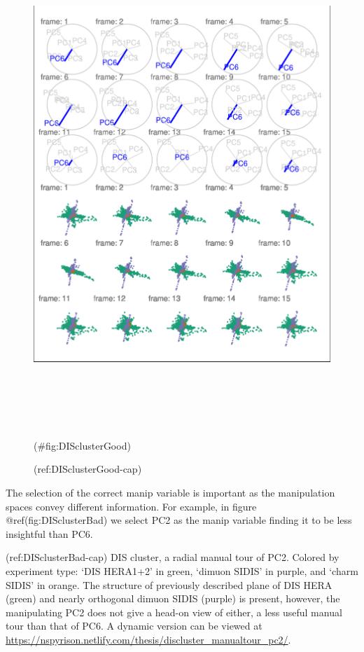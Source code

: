 \begin{Schunk}
\begin{figure}

{\centering \includegraphics[width=6in,height=7.2in]{spinifex_paper_files/figure-latex/DISclusterGood-1} 

}

\caption[(ref:DISclusterGood-cap)]{(ref:DISclusterGood-cap)}(\#fig:DISclusterGood)
\end{figure}
\end{Schunk}

The selection of the correct manip variable is important as the manipulation spaces convey different information. For example, in figure @ref(fig:DISclusterBad) we select PC2 as the manip variable finding it to be less insightful than PC6.

(ref:DISclusterBad-cap) DIS cluster, a radial manual tour of PC2. Colored by experiment type: `DIS HERA1+2' in green, `dimuon SIDIS' in purple, and `charm SIDIS' in orange. The structure of previously described plane of DIS HERA (green) and nearly orthogonal dimuon SIDIS (purple) is present, however, the manipulating PC2 does not give a head-on view of either, a less useful manual tour than that of PC6. A dynamic version can be viewed at \url{https://nspyrison.netlify.com/thesis/discluster_manualtour_pc2/}.


